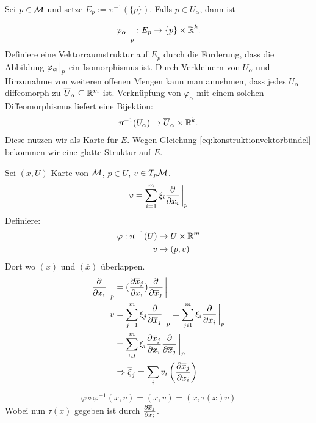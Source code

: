 \begin{bew}
Sei  $p\in\mathcal{M}$ und setze $E_p := \pi^{-1}(\{ p \})$. 
Falls $p\in U_\alpha$, dann ist 
\begin{align}
\varphi_\alpha \eval_p : E_p \to \{ p \} \times \R^k.
\end{align}
Definiere eine Vektorraumstruktur auf $E_p$ durch die Forderung, dass die Abbildung $\varphi_\alpha \eval_p$ ein Isomorphismus ist.
Durch Verkleinern von $U_\alpha$ und Hinzunahme von weiteren offenen Mengen kann man annehmen, dass jedes $U_\alpha$ diffeomorph zu $\overline{U}_\alpha \subseteq \mathbb{R}^m$ ist.
Verknüpfung von $\varphi_\alpha$ mit einem solchen Diffeomorphismus liefert eine Bijektion:
\begin{align}
\uppi^{-1} (U_\alpha) \to \overline{U}_\alpha \times \mathbb{R}^k .
\end{align}
Diese nutzen wir als Karte für $E$.
Wegen Gleichung \ref{eq:konstruktionvektorbündel} bekommen wir eine glatte Struktur auf $E$.
\end{bew}
Sei $(x, U)$ Karte von $\mathcal{M}$, $p\in U$, $v\in T_p \mathcal{M}$.
\begin{align}
v = \sum_{i=1}^{m} \xi_i \pdv{x_i}\eval_p
\end{align}
Definiere:
\begin{align}
\varphi: \uppi^{-1} (U) &\to U \times \mathbb{R}^m\\
v &\mapsto (p, v)
\end{align}
Dort wo $(x)$ und $(\overline{x})$ überlappen.
\begin{align}
\pdv{x_i} \eval_p &= (\pdv{\overline{x}_j}{x_i})\pdv{\overline{x}_j} \eval\\
v &= \sum_{j=1}^{m} \xi_j \pdv{\overline{x}_j}  \eval_p = \sum_{ji1}^{m} \xi_i \pdv{x_i}  \eval_p \\
&= \sum_{i, j}^{m} \xi_i \pdv{\overline{x}_j}{x_i}  \pdv{\overline{x}_j}\eval_p\\
&\Rightarrow \overline{\xi}_j = \sum_i v_i \left( \pdv{\overline{x}_j}{x_i} \right)
\end{align}
\begin{align}
\overline{\varphi} \circ \varphi^{-1}(x, v) = (x, \overline{v}) = (x, \tau(x) v)
\end{align}
Wobei nun $\tau(x)$ gegeben ist durch $\pdv{\overline{x}_j}{x_i}$.\\